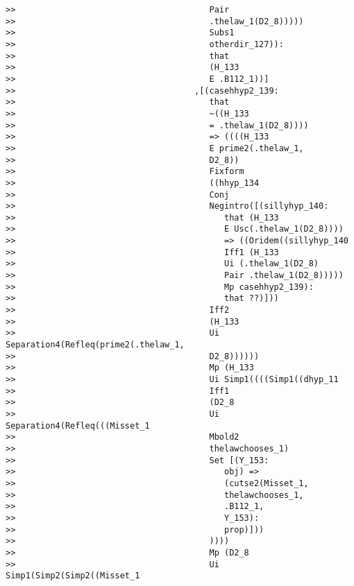\documentclass[12pt]{article}
\begin{document}
\begin{verbatim}
>>                                       Pair
>>                                       .thelaw_1(D2_8)))))
>>                                       Subs1
>>                                       otherdir_127)):
>>                                       that
>>                                       (H_133
>>                                       E .B112_1))]
>>                                    ,[(casehhyp2_139:
>>                                       that
>>                                       ~((H_133
>>                                       = .thelaw_1(D2_8))))
>>                                       => ((((H_133
>>                                       E prime2(.thelaw_1,
>>                                       D2_8))
>>                                       Fixform
>>                                       ((hhyp_134
>>                                       Conj
>>                                       Negintro([(sillyhyp_140:
>>                                          that (H_133
>>                                          E Usc(.thelaw_1(D2_8))))
>>                                          => ((Oridem((sillyhyp_140
>>                                          Iff1 (H_133
>>                                          Ui (.thelaw_1(D2_8)
>>                                          Pair .thelaw_1(D2_8)))))
>>                                          Mp casehhyp2_139):
>>                                          that ??)]))
>>                                       Iff2
>>                                       (H_133
>>                                       Ui Separation4(Refleq(prime2(.thelaw_1,
>>                                       D2_8))))))
>>                                       Mp (H_133
>>                                       Ui Simp1((((Simp1((dhyp_11
>>                                       Iff1
>>                                       (D2_8
>>                                       Ui Separation4(Refleq(((Misset_1
>>                                       Mbold2
>>                                       thelawchooses_1)
>>                                       Set [(Y_153:
>>                                          obj) =>
>>                                          (cutse2(Misset_1,
>>                                          thelawchooses_1,
>>                                          .B112_1,
>>                                          Y_153):
>>                                          prop)]))
>>                                       ))))
>>                                       Mp (D2_8
>>                                       Ui Simp1(Simp2(Simp2((Misset_1

\end{verbatim}
\end{document}
